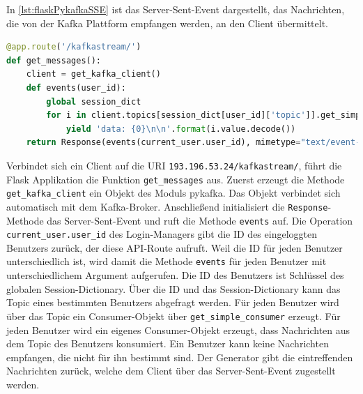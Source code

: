 \documentclass[a4paper,titlepage,halfparskip,12pt]{scrreprt}
\begin{document}
\begin{onehalfspacing}
In \autoref{lst:flaskPykafkaSSE} ist das Server-Sent-Event dargestellt, das Nachrichten, die von der Kafka Plattform empfangen werden, an den Client übermittelt.

\begin{lstlisting}[language=python, caption={Code des Server-Sent-Events für den Empfang von Nachrichten der Kafka Plattform}, label={lst:flaskPykafkaSSE}]
@app.route('/kafkastream/')
def get_messages():
    client = get_kafka_client()
    def events(user_id):
        global session_dict
        for i in client.topics[session_dict[user_id]['topic']].get_simple_consumer():
            yield 'data: {0}\n\n'.format(i.value.decode())
    return Response(events(current_user.user_id), mimetype="text/event-stream")
\end{lstlisting}

Verbindet sich ein Client auf die \acs{URI} \texttt{193.196.53.24/kafkastream/}, führt die Flask Applikation die Funktion \texttt{get\_messages} aus. Zuerst erzeugt die Methode \texttt{get\_kafka\_client} ein Objekt des Moduls pykafka. Das Objekt verbindet sich automatisch mit dem Kafka-Broker. Anschließend initialisiert die \texttt{Response}-Methode das Server-Sent-Event und ruft die Methode \texttt{events} auf.
Die Operation \texttt{current\_user.user\_id} des Login-Managers gibt die ID des eingeloggten Benutzers zurück, der diese \acs{API}-Route aufruft. Weil die ID für jeden Benutzer unterschiedlich ist, wird damit die Methode \texttt{events} für jeden Benutzer mit unterschiedlichem Argument aufgerufen. Die ID des Benutzers ist Schlüssel des globalen Session-Dictionary. Über die ID und das Session-Dictionary kann das Topic eines bestimmten Benutzers abgefragt werden. Für jeden Benutzer wird über das Topic ein Consumer-Objekt über \texttt{get\_simple\_consumer} erzeugt. Für jeden Benutzer wird ein eigenes Consumer-Objekt erzeugt, dass Nachrichten aus dem Topic des Benutzers konsumiert. Ein Benutzer kann keine Nachrichten empfangen, die nicht für ihn bestimmt sind. Der Generator gibt die eintreffenden Nachrichten zurück, welche dem Client über das Server-Sent-Event zugestellt werden.


\end{onehalfspacing}
\end{document}
